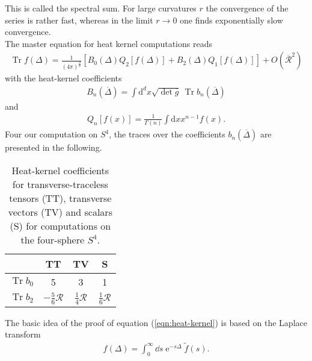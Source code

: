 This is called the spectral sum. For large curvatures $r$ the convergence of the series is rather fast, whereas in the limit $r\rightarrow 0$ one finds exponentially slow convergence.\\
The master equation for heat kernel computations reads
\begin{align}
	\operatorname{Tr} f(\Delta)=\frac{1}{(4 \pi)^{\frac{d}{2}}}\left[B_{0}(\Delta) Q_{2}[f(\Delta)]+B_{2}(\Delta) Q_{1}[f(\Delta)]\right]+O\left(\overline{\mathcal{R}}^{2}\right)
\end{align}
with the heat-kernel coefficients 
\begin{align}
	B_{n}(\overline{\Delta})=\int \mathrm{d}^{d} x \sqrt{\operatorname{det}\overline{g}} \  \operatorname{Tr} b_{n}(\overline{\Delta})
\end{align}
and 
\begin{align}
	Q_{n}[f(x)]=\frac{1}{\Gamma(n)} \int \mathrm{d} x x^{n-1} f(x).
\end{align}
Four our computation on $S^4$, the traces over the coefficients $b_n(\overline{\Delta})$ are presented in the following.
\begin{table}[H]
	\centering
	\setlength{\tabcolsep}{5mm}
	\setlength\extrarowheight{2mm}
	\begin{tabular}{c c c c}
	   & TT & TV & S\\ \hline
	   $\operatorname{Tr} b_{0}$ & 5 &  3 & 1\\
	  $\operatorname{Tr} b_{2}$ & $-\frac{5}{6}\mathcal{R}$ & $\frac{1}{4}\mathcal{R}$& $\frac{1}{6}\mathcal{R}$\\
	\end{tabular}
	\caption{Heat-kernel coefficients for transverse-traceless tensors (TT), transverse vectors (TV) and scalars (S) for computations on the four-sphere $S^4$.}
\end{table}

The basic idea of the proof of equation (\ref{eqn:heat-kernel}) is based on the Laplace transform
\begin{align}
	f(\Delta) = \int_0^{\infty} \dd s \operatorname{e}^{-s\Delta}\tilde{f}(s).
\end{align}


